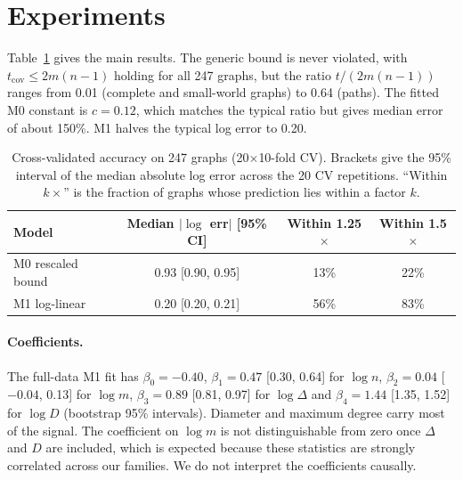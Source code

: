 \documentclass{article}
\begin{document}
\section{Experiments}
\label{sec:exp}
Table~\ref{tab:cv} gives the main results. The generic bound is never violated, with $t_{\mathrm{cov}}\le 2m(n-1)$ holding for all 247 graphs, but the ratio $t/(2m(n-1))$ ranges from 0.01 (complete and small-world graphs) to 0.64 (paths). The fitted M0 constant is $c=0.12$, which matches the typical ratio but gives median error of about 150\%. M1 halves the typical log error to 0.20.

\begin{table}[t]
\caption{Cross-validated accuracy on 247 graphs (20$\times$10-fold CV). Brackets give the 95\% interval of the median absolute log error across the 20 CV repetitions. ``Within $k\times$'' is the fraction of graphs whose prediction lies within a factor $k$.}
\label{tab:cv}
\begin{center}
\begin{small}
\begin{tabular}{lccc}
\toprule
Model & Median $|\log$ err$|$ [95\% CI] & Within 1.25$\times$ & Within 1.5$\times$ \\
\midrule
M0 rescaled bound & 0.93 [0.90, 0.95] & 13\% & 22\% \\
M1 log-linear & 0.20 [0.20, 0.21] & 56\% & 83\% \\
\bottomrule
\end{tabular}
\end{small}
\end{center}
\vskip -0.1in
\end{table}

\paragraph{Coefficients.} The full-data M1 fit has $\beta_0=-0.40$, $\beta_1=0.47$ [0.30, 0.64] for $\log n$, $\beta_2=0.04$ [$-0.04$, 0.13] for $\log m$, $\beta_3=0.89$ [0.81, 0.97] for $\log\Delta$ and $\beta_4=1.44$ [1.35, 1.52] for $\log D$ (bootstrap 95\% intervals). Diameter and maximum degree carry most of the signal. The coefficient on $\log m$ is not distinguishable from zero once $\Delta$ and $D$ are included, which is expected because these statistics are strongly correlated across our families. We do not interpret the coefficients causally.
\end{document}

